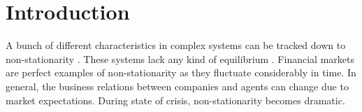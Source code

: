 \section{Introduction}\label{sec:introduction}

A bunch of different characteristics in complex systems can be tracked down to
non-stationarity \cite{non_stat_1,non_stat_2}. These systems lack any kind of
equilibrium \cite{comp_sys_1,comp_sys_2,comp_sys_3,comp_sys_4}. Financial
markets are perfect examples of non-stationarity as they fluctuate considerably
in time. In general, the business relations between companies and agents can
change due to market expectations. During state of crisis, non-stationarity
becomes dramatic.
